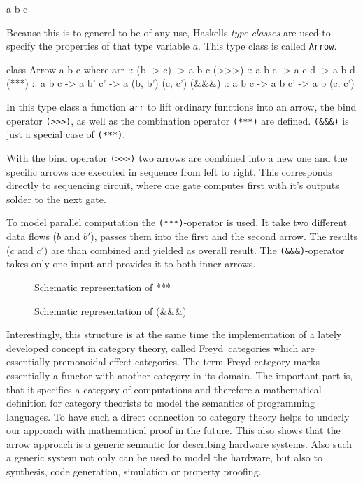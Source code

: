 \documentclass[9pt,final,a4paper,leqno]{article}
\newcommand{\xfig}[4][0.9] {%
    \begin{figure}[ht]
        \begin{center}
            \graphicspath{{./}{Images/}}
            \scalebox{#1}{%
                
            }
            \caption{\label{#4} #3}
        \end{center}
    \end{figure}
}
\newcommand{\hs}[1]{\mbox{\lstinline[basicstyle=\color{textgray}]!#1!}}
\begin{document}
\begin{center}
\begin{minipage}{.2\textwidth}
\begin{haskell}
a b c
\end{haskell}
\end{minipage} \end{center}

Because this is to general to be of any use, Haskells \emph{type classes} are used to specify the properties of that type variable $a$. This
type class is called \hs{Arrow}. 

\begin{haskell}
class Arrow a b c where 
  arr   :: (b -> c) -> a b c
  (>>>)  :: a b c    -> a c d   -> a b d
  (***) :: a b c    -> a b' c' -> a (b, b') (c, c')
  (&&&) :: a b c    -> a b  c' -> a  b      (c, c')
\end{haskell}

In this type class a function \hs{arr} to lift ordinary functions into an arrow, the bind operator \hs{(>>>)}, as well as the combination
operator \hs{(***)} are defined. \hs{(&&&)} is just a special case of \hs{(***)}. 

\par
With the bind operator \hs{(>>>)} two arrows are combined into a new one and the specific arrows are executed in sequence from left to
right. This corresponds directly to sequencing circuit, where one gate computes first with it's outputs solder to the next gate. 
\par 
To model parallel computation the \hs{(***)}-operator is used. It take two different data flows ($b$ and $b'$), passes them into the first
and the second arrow. The results ($c$ and $c'$) are than combined and yielded as overall result. The \hs{(&&&)}-operator takes only one
input and provides it to both inner arrows.

\xfig[.6]{ArrowStarStarStar}{Schematic representation of ***}{figure:ststst}
\xfig[.6]{ArrowAndAndAnd}{Schematic representation of (\&\&\&)}{figure:ananan}

\par
Interestingly, this structure is at the same time the implementation of a lately developed concept in category theory, called Freyd~categories 
which are essentially premonoidal effect categories\cite{Heunen06arrows, Hughes98generalisingmonads,PatersonRA}. The term Freyd
category marks essentially a functor with another category in its domain. The important part is, that it specifies a category of
computations and therefore a mathematical definition for category theorists to model the semantics of programming languages. To have such a
direct connection to category theory helps to underly our approach with mathematical proof in the future. This also shows that the arrow
approach is a generic semantic for describing hardware systems. Also such a generic system not only can be used to model the hardware, but
also to synthesis, code generation, simulation or property proofing. 
\end{document}
